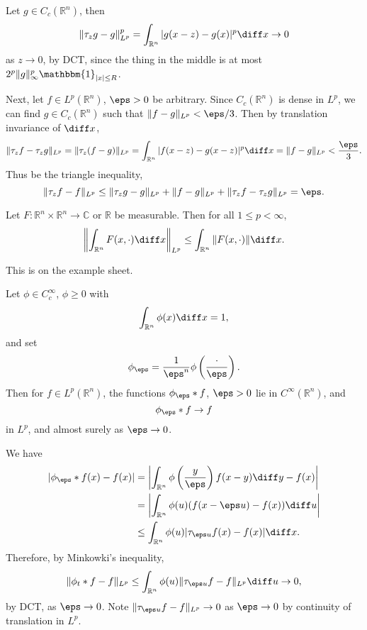 \documentclass[12pt]{article}
\begin{document}
\begin{proofbox}
	Let $g \in C_c(\mathbb{R}^n)$, then
	\begin{align*}
		\|\tau_z g - g\|_{L^p}^p = \int_{\mathbb{R}^n} |g(x - z) - g(x)|^p \diff x \to 0
	\end{align*}
	as $z \to 0$, by DCT, since the thing in the middle is at most $2^p \|g\|_\infty^p \mathbbm{1}_{|x| \leq R}$.

	Next, let $f \in L^p(\mathbb{R}^n)$, $\eps > 0$ be arbitrary. Since $C_c(\mathbb{R}^n)$ is dense in $L^p$, we can find $g \in C_c(\mathbb{R}^n)$ such that $\|f - g\|_{L^p} < \eps/3$. Then by translation invariance of $\diff x$,
	\[
	\|\tau_z f - \tau_z g\|_{L^p} = \|\tau_z(f - g)\|_{L^p} = \int_{\mathbb{R}^n} |f(x-z) - g(x - z)|^p \diff x = \|f - g\|_{L^p} < \frac{\eps}{3}.
	\]
	Thus be the triangle inequality,
	\[
	\|\tau_z f - f\|_{L^p} \leq \|\tau_z g - g\|_{L^p} + \|f - g\|_{L^p} + \|\tau_z f - \tau_z g\|_{L^p} = \eps.
	\]
\end{proofbox}

\begin{proposition}
	Let $F : \mathbb{R}^n \times \mathbb{R}^n \to \mathbb{C}$ or $\mathbb{R}$ be measurable. Then for all $1 \leq p < \infty$,
	\[
	\left\|\int_{\mathbb{R}^n} F(x, \cdot) \diff x \right\|_{L^p} \leq \int_{\mathbb{R}^n} \|F(x, \cdot)\| \diff x.
	\]
\end{proposition}

This is on the example sheet.

\begin{theorem}
	Let $\phi \in C_c^\infty$, $\phi \geq 0$ with
	\[
	\int_{\mathbb{R}^n} \phi(x) \diff x = 1,
	\]
	and set
	\[
	\phi_\eps = \frac{1}{\eps^{n}} \phi \left( \frac{\cdot}{\eps} \right).
	\]
	Then for $f \in L^p(\mathbb{R}^n)$, the functions $\phi_\eps \ast f$, $\eps > 0$ lie in $C^\infty(\mathbb{R}^n)$, and
	\[
	\phi_\eps \ast f \to f
	\]
	in $L^p$, and almost surely as $\eps \to 0$.
\end{theorem}


\begin{proofbox}
	We have
	\begin{align*}
		|\phi_\eps \ast f(x) - f(x)| &= \left| \int_{\mathbb{R}^n} \phi \left( \frac{y}{\eps} \right) f(x - y) \diff y - f(x) \right| \\
					     &= \left| \int_{\mathbb{R}^n} \phi(u) (f(x - \eps u) - f(x)) \diff u \right| \\
					     &\leq \int_{\mathbb{R}^n} \phi(u) |\tau_{\eps u}f(x) - f(x) |\diff x.
	\end{align*}
	Therefore, by Minkowki's inequality,
	\[
	\|\phi_t \ast f - f\|_{L^p} \leq \int_{\mathbb{R}^n} \phi(u) \|\tau_{\eps u}f - f\|_{L^p} \diff u \to 0,
	\]
	by DCT, as $\eps \to 0$. Note $\|\tau_{\eps u}f - f\|_{L^p} \to 0$ as $\eps \to 0$ by continuity of translation in $L^p$.
\end{proofbox}
\end{document}
